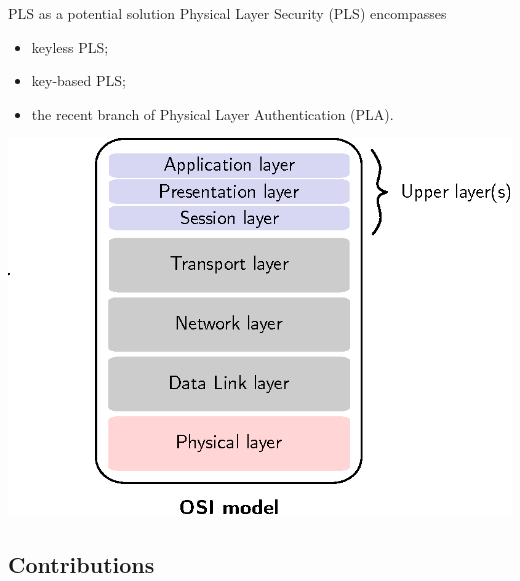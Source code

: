 \begin{frame}{PLS as a potential solution}
    Physical Layer Security (PLS) encompasses
    \begin{itemize}
        \item keyless PLS;
        \item key-based PLS;
        \item the recent branch of Physical Layer Authentication (PLA).
        \end{itemize}
    \begin{center}
        \includegraphics[width = 0.6\linewidth]{slides/figures/iso.eps}
        
    \end{center}
\end{frame}




    


\subsection{Contributions}

